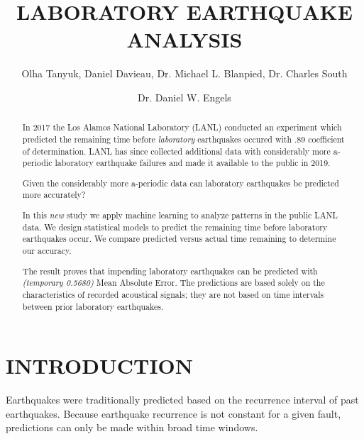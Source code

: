 \documentclass[]{llncs}
\begin{document}

\title{LABORATORY EARTHQUAKE ANALYSIS}

\author{Olha Tanyuk, Daniel Davieau, Dr. Michael L. Blanpied, Dr. Charles South \and Dr. Daniel W. Engels}


\maketitle

\begin{abstract}
In 2017 the Los Alamos National Laboratory (LANL) conducted an experiment which predicted the remaining time before {\em laboratory} earthquakes occured with .89 coefficient of determination\cite{Bertrand}. LANL has since collected additional data with considerably more a-periodic laboratory earthquake failures and made it available to the public in 2019.

Given the considerably more a-periodic data can laboratory earthquakes be predicted more accurately?

In this {\em new} study we apply machine learning to analyze patterns in the public LANL data. We design statistical models to predict the remaining time before laboratory earthquakes occur.  We compare predicted versus actual time remaining to determine our accuracy.\par

The result proves that impending laboratory earthquakes can be predicted with {\em(temporary 0.5680)} Mean Absolute Error. The predictions are based solely on the characteristics of recorded acoustical signals; they are not based on time intervals between prior laboratory earthquakes.\par



\end{abstract}
\section{INTRODUCTION}
Earthquakes were traditionally predicted based on the recurrence interval of past earthquakes. Because earthquake recurrence is not constant for a given fault, predictions can only be made within broad time windows.\par 
\end{document}
